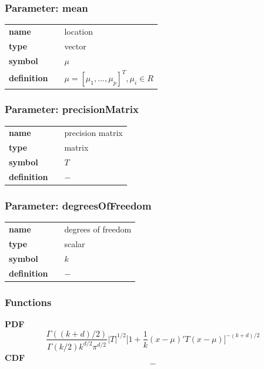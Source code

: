 
\subsubsection*{Parameter: mean}

\noindent\begin{tabular}{p{2cm}cl}
\textbf{name} & & location \\
\textbf{type} & & vector \\
\textbf{symbol} & & $\mu$  \\
\textbf{definition} & & $\mu = [\mu_1, \dots, \mu_p]^T, \mu_i \in R$
\end{tabular}
\subsubsection*{Parameter: precisionMatrix}

\noindent\begin{tabular}{p{2cm}cl}
\textbf{name} & & precision matrix \\
\textbf{type} & & matrix \\
\textbf{symbol} & & $T$  \\
\textbf{definition} & & $-$
\end{tabular}
\subsubsection*{Parameter: degreesOfFreedom}

\noindent\begin{tabular}{p{2cm}cl}
\textbf{name} & & degrees of freedom \\
\textbf{type} & & scalar \\
\textbf{symbol} & & $k$  \\
\textbf{definition} & & $-$
\end{tabular}
\subsubsection*{Functions}

\smallskip \noindent \hspace{.2cm} \textbf{PDF} 
\begin{equation*}\frac{\Gamma((k+d)/2)}{\Gamma(k/2) k^{d/2} \pi^{d/2}}|T|^{1/2} \Big[ 1 + \frac{1}{k}(x-\mu)' T (x-\mu) \Big]^{-(k+d)/2}\end{equation*}
\smallskip \noindent \hspace{.2cm} \textbf{CDF} 
\begin{equation*}-\end{equation*}
\smallskip
